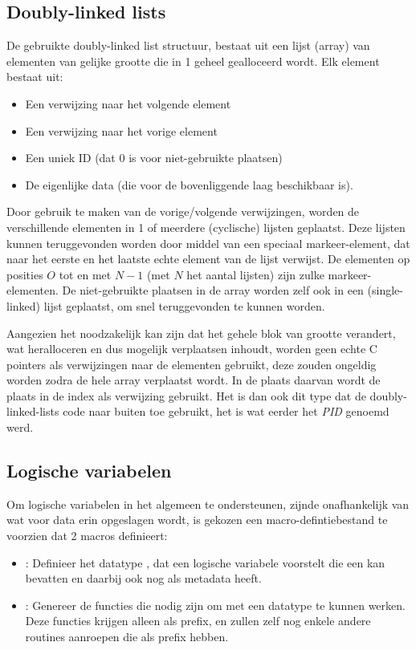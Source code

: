 \subsection{Doubly-linked lists} \label{sec:dll}

De gebruikte doubly-linked list structuur, bestaat uit een lijst (array) van elementen van gelijke grootte die in 1 geheel gealloceerd wordt. Elk element bestaat uit: \begin{itemize}
  \item Een verwijzing naar het volgende element
  \item Een verwijzing naar het vorige element
  \item Een uniek ID (dat $0$ is voor niet-gebruikte plaatsen)
  \item De eigenlijke data (die voor de bovenliggende laag beschikbaar is).
\end{itemize}
Door gebruik te maken van de vorige/volgende verwijzingen, worden de verschillende elementen in 1 of meerdere (cyclische) lijsten geplaatst. Deze lijsten kunnen teruggevonden worden door middel van een speciaal markeer-element, dat naar het eerste en het laatste echte element van de lijst verwijst. De elementen op posities $O$ tot en met $N-1$ (met $N$ het aantal lijsten) zijn zulke markeer-elementen. De niet-gebruikte plaatsen in de array worden zelf ook in een (single-linked) lijst geplaatst, om snel teruggevonden te kunnen worden.

Aangezien het noodzakelijk kan zijn dat het gehele blok van grootte verandert, wat heralloceren en dus mogelijk verplaatsen inhoudt, worden geen echte C pointers als verwijzingen naar de elementen gebruikt, deze zouden ongeldig worden zodra de hele array verplaatst wordt. In de plaats daarvan wordt de plaats in de index als verwijzing gebruikt. Het is dan ook dit type dat de doubly-linked-lists code naar buiten toe gebruikt, het is wat eerder het {\em PID} genoemd werd. 

\subsection{Logische variabelen} \label{sec:logvar}

Om logische variabelen in het algemeen te ondersteunen, zijnde onafhankelijk van wat voor data erin opgeslagen wordt, is gekozen een macro-defintiebestand te voorzien dat 2 macros definieert: \begin{itemize}
  \item {}: Definieer het datatype , dat een logische variabele voorstelt die een  kan bevatten en daarbij ook nog  als metadata heeft.
  \item {}: Genereer de functies die nodig zijn om met een  datatype te kunnen werken. Deze functies krijgen alleen  als prefix, en zullen zelf nog enkele andere routines aanroepen die  als prefix hebben.
\end{itemize}

